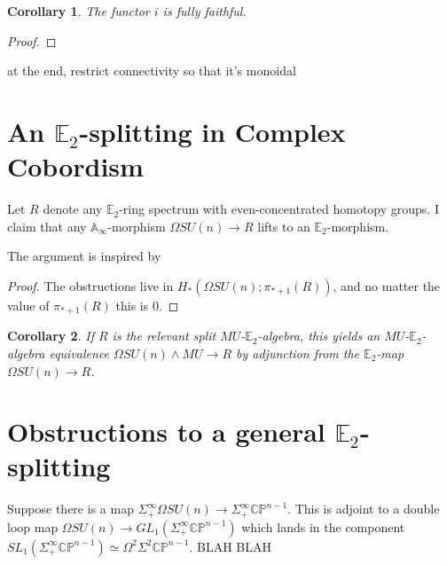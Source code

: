 \documentclass[oneside]{amsart}
\theoremstyle{definition}
\theoremstyle{plain}
\newtheorem{cor}{Corollary}[nul]
\DeclareMathOperator{\smsh}{\wedge}
\begin{document}
\begin{cor}
The functor $i$ is fully faithful.
\end{cor}
\begin{proof}
\end{proof}

at the end, restrict connectivity so that it's monoidal

\section{An \texorpdfstring{$\mathbb{E}_2$}{E2}-splitting in Complex Cobordism} \label{sec:MUE2}

Let $R$ denote any $\mathbb{E}_2$-ring spectrum with even-concentrated homotopy groups.  I claim that any $\mathbb{A}_\infty$-morphism $\Omega SU(n) \rightarrow R$ lifts to an $\mathbb{E}_2$-morphism.

The argument is inspired by \cite{ChadwickMandell}
\begin{proof}
The obstructions live in $H_*(\Omega SU(n);\pi_{*+1}(R))$, and no matter the value of $\pi_{*+1}(R)$ this is $0$.
\end{proof}

\begin{cor}
If $R$ is the relevant split $MU$-$\mathbb{E}_2$-algebra, this yields an $MU$-$\mathbb{E}_2$-algebra equivalence $\Omega SU(n) \smsh MU \rightarrow R$ by adjunction from the $\mathbb{E}_2$-map $\Omega SU(n) \rightarrow R$.
\end{cor}

\section{Obstructions to a general \texorpdfstring{$\mathbb{E}_2$}{E2}-splitting}

Suppose there is a map $\Sigma^{\infty}_+ \Omega SU(n) \rightarrow \Sigma^{\infty}_+ \mathbb{CP}^{n-1}$.  This is adjoint to a double loop map $\Omega SU(n) \rightarrow GL_1(\Sigma^{\infty}_+\mathbb{CP}^{n-1})$ which lands in the component $SL_1(\Sigma^{\infty}_+ \mathbb{CP}^{n-1}) \simeq \Omega^2 \Sigma^2 \mathbb{CP}^{n-1}$.  BLAH BLAH
\end{document}
